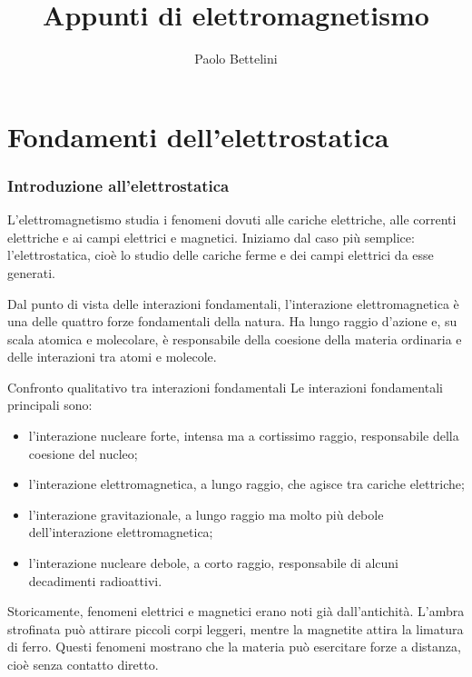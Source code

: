 \documentclass[a4paper]{article}
\title{Appunti di elettromagnetismo}
\author{Paolo Bettelini}
\date{}
\begin{document}
\maketitle
\tableofcontents

\part{Fondamenti dell'elettrostatica}

\section{Introduzione all'elettrostatica}

L'elettromagnetismo studia i fenomeni dovuti alle cariche elettriche, alle correnti elettriche e ai campi elettrici e magnetici. Iniziamo dal caso più semplice: l'elettrostatica, cioè lo studio delle cariche ferme e dei campi elettrici da esse generati.

Dal punto di vista delle interazioni fondamentali, l'interazione elettromagnetica è una delle quattro forze fondamentali della natura. Ha lungo raggio d'azione e, su scala atomica e molecolare, è responsabile della coesione della materia ordinaria e delle interazioni tra atomi e molecole.

\begin{snippetproposition}{Confronto qualitativo tra interazioni fondamentali}
    Le interazioni fondamentali principali sono:
    \begin{itemize}
        \item l'interazione nucleare forte, intensa ma a cortissimo raggio, responsabile della coesione del nucleo;
        \item l'interazione elettromagnetica, a lungo raggio, che agisce tra cariche elettriche;
        \item l'interazione gravitazionale, a lungo raggio ma molto più debole dell'interazione elettromagnetica;
        \item l'interazione nucleare debole, a corto raggio, responsabile di alcuni decadimenti radioattivi.
    \end{itemize}
\end{snippetproposition}

Storicamente, fenomeni elettrici e magnetici erano noti già dall'antichità. L'ambra strofinata può attirare piccoli corpi leggeri, mentre la magnetite attira la limatura di ferro. Questi fenomeni mostrano che la materia può esercitare forze a distanza, cioè senza contatto diretto.
\end{document}
